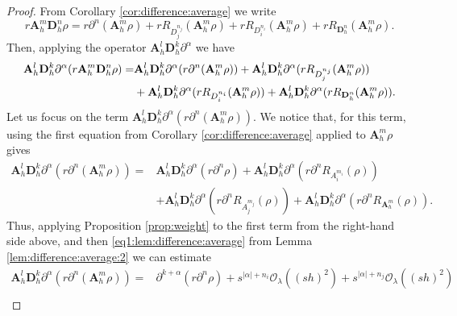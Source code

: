 \documentclass[11pt,oneside,leqno]{amsart}
\numberwithin{equation}{section}
\numberwithin{equation}{section}
\begin{document}
\begin{proof}
From Corollary \ref{cor:difference:average} we write
\begin{equation*}
    r\mathbf{A}_{h}^{m}\mathbf{D}_{h}^{n}\rho= r\partial^{n}(\mathbf{A}_{h}^{m}\rho)+rR_{D^{n_{j}}_{j}}(\mathbf{A}_{h}^{m}\rho)+rR_{D^{n_{i}}_{i}}(\mathbf{A}_{h}^{m}\rho)+rR_{\mathbf{D}_{h}^{n}}(\mathbf{A}_{h}^{m}\rho).
\end{equation*}
Then, applying the operator $\mathbf{A}_{h}^{l}\mathbf{D}_{h}^{k}\partial^{\alpha}$ we have
\begin{align}\label{eq:prop:difference}
    \mathbf{A}_{h}^{l}\mathbf{D}_{h}^{k}\partial^{\alpha}  (r\mathbf{A}_{h}^{m}\mathbf{D}_{h}^{n}\rho)=&  \mathbf{A}_{h}^{l}\mathbf{D}_{h}^{k}\partial^{\alpha}(r\partial^{n}(\mathbf{A}_{h}^{m}\rho))+ \mathbf{A}_{h}^{l}\mathbf{D}_{h}^{k}\partial^{\alpha}(rR_{D^{n_{j}}_{j}}(\mathbf{A}_{h}^{m}\rho))\notag\\
    &+ \mathbf{A}_{h}^{l}\mathbf{D}_{h}^{k}\partial^{\alpha}(rR_{D^{n_{i}}_{i}}(\mathbf{A}_{h}^{m}\rho))+ \mathbf{A}_{h}^{l}\mathbf{D}_{h}^{k}\partial^{\alpha}(rR_{\mathbf{D}_{h}^{n}}(\mathbf{A}_{h}^{m}\rho)).
\end{align}
Let us focus on the term $\mathbf{A}_{h}^{l}\mathbf{D}_{h}^{k}\partial^{\alpha}(r\partial^{n}(\mathbf{A}_{h}^{m}\rho))$. We notice that, for this term, using the first equation from Corollary \ref{cor:difference:average} applied to $\mathbf{A}_{h}^{m}\rho$ gives
\begin{align*}
    \mathbf{A}_{h}^{l}\mathbf{D}_{h}^{k}\partial^{\alpha}(r\partial^{n}(\mathbf{A}_{h}^{m}\rho))=&\mathbf{A}_{h}^{l}\mathbf{D}_{h}^{k}\partial^{\alpha}(r\partial^{n}\rho)+\mathbf{A}_{h}^{l}\mathbf{D}_{h}^{k}\partial^{\alpha}(r\partial^{n}R_{A_{i}^{m_{i}}}(\rho))\\
    &+\mathbf{A}_{h}^{l}\mathbf{D}_{h}^{k}\partial^{\alpha}(r\partial^{n}R_{A_{j}^{m_{j}}}(\rho))+\mathbf{A}_{h}^{l}\mathbf{D}_{h}^{k}\partial^{\alpha}(r\partial^{n}R_{\mathbf{A}_{h}^{m}}(\rho)).
    \end{align*}
    Thus, applying Proposition \ref{prop:weight} to the first term from the right-hand side above, and then \eqref{eq1:lem:difference:average} from Lemma \ref{lem:difference:average:2} we can estimate 
    \begin{align*}
    \mathbf{A}_{h}^{l}\mathbf{D}_{h}^{k}\partial^{\alpha}(r\partial^{n}(\mathbf{A}_{h}^{m}\rho))=&\partial^{k+\alpha}(r\partial^{n}\rho)+s^{|\alpha|+n_{i}}\mathcal{O}_{\lambda}((sh)^{2})+s^{|\alpha|+n_{j}}\mathcal{O}_{\lambda}((sh)^{2})\\

\end{align*}
\end{proof}
\end{document}
